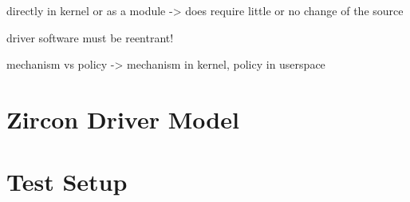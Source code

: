 \cite{lfd430}
directly in kernel or as a module -> does require little or no change of the source


driver software must be reentrant!

\cite{lfd430}
mechanism vs policy -> mechanism in kernel, policy in userspace

%

%


\section{Zircon Driver Model}

\section{Test Setup}

